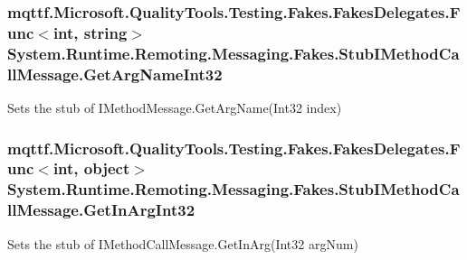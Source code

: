 \hypertarget{class_system_1_1_runtime_1_1_remoting_1_1_messaging_1_1_fakes_1_1_stub_i_method_call_message_af09aae2a88e9d878bb8b8fd530d51e14}{
\subsubsection[{Get\-Arg\-Name\-Int32}]{\setlength{\rightskip}{0pt plus 5cm}mqttf.\-Microsoft.\-Quality\-Tools.\-Testing.\-Fakes.\-Fakes\-Delegates.\-Func$<$int, string$>$ System.\-Runtime.\-Remoting.\-Messaging.\-Fakes.\-Stub\-I\-Method\-Call\-Message.\-Get\-Arg\-Name\-Int32}}\label{class_system_1_1_runtime_1_1_remoting_1_1_messaging_1_1_fakes_1_1_stub_i_method_call_message_af09aae2a88e9d878bb8b8fd530d51e14}


Sets the stub of I\-Method\-Message.\-Get\-Arg\-Name(\-Int32 index)

\hypertarget{class_system_1_1_runtime_1_1_remoting_1_1_messaging_1_1_fakes_1_1_stub_i_method_call_message_a0f3e3cf49836818497a1b1d896f98bfd}{
\subsubsection[{Get\-In\-Arg\-Int32}]{\setlength{\rightskip}{0pt plus 5cm}mqttf.\-Microsoft.\-Quality\-Tools.\-Testing.\-Fakes.\-Fakes\-Delegates.\-Func$<$int, object$>$ System.\-Runtime.\-Remoting.\-Messaging.\-Fakes.\-Stub\-I\-Method\-Call\-Message.\-Get\-In\-Arg\-Int32}}\label{class_system_1_1_runtime_1_1_remoting_1_1_messaging_1_1_fakes_1_1_stub_i_method_call_message_a0f3e3cf49836818497a1b1d896f98bfd}


Sets the stub of I\-Method\-Call\-Message.\-Get\-In\-Arg(\-Int32 arg\-Num)

